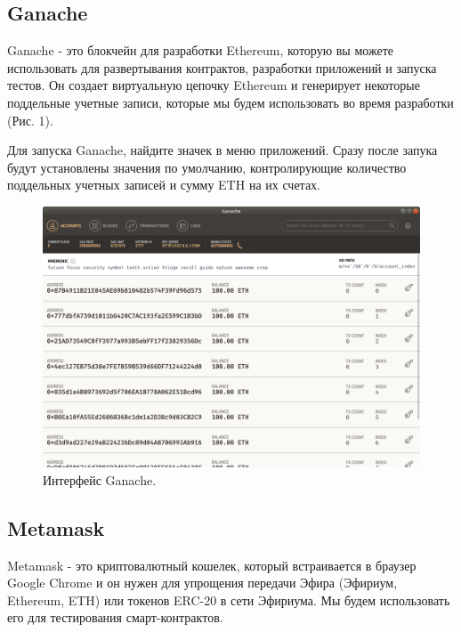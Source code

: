 \documentclass{article}
\begin{document}
\subsection{Ganache}

Ganache - это блокчейн для разработки Ethereum, которую вы можете использовать для развертывания контрактов, разработки приложений и запуска тестов. Он создает виртуальную цепочку Ethereum и генерирует некоторые поддельные учетные записи, которые мы будем использовать во время разработки (Рис. 1).

Для запуска Ganache, найдите значек в меню приложений. Сразу после запука будут установлены значения по умолчанию, контролирующие количество поддельных учетных записей и сумму ETH на их счетах.

\begin{figure}
    \centering
    \includegraphics[scale=0.4]{ganache_1}
    \caption{Интерфейс Ganache.}
    \label{fig:ganache_1}
\end{figure}

\subsection{Metamask}

Metamask -  это криптовалютный кошелек, который встраивается в браузер Google Chrome и он нужен для упрощения передачи Эфира (Эфириум,  Ethereum, ETH)  или токенов ERC-20  в сети Эфириума. Мы будем использовать его для тестирования смарт-контрактов.
\end{document}
